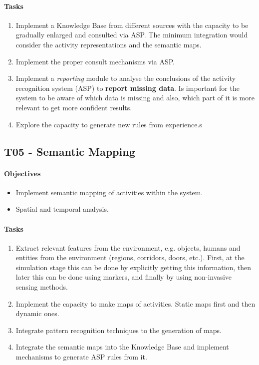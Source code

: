 \paragraph{Tasks}
\begin{enumerate}[label= T04-\Alph*:]
\item Implement a Knowledge Base from different sources with the capacity to be gradually enlarged and consulted via ASP. The minimum integration would consider the activity representations and the semantic maps.
\item Implement the proper consult mechanisms via ASP.
\item Implement a \textit{reporting} module to analyse the conclusions of the activity recognition system (ASP) to \textbf{report missing data}. Is important for the system to be aware of which data is missing and also, which part of it is more relevant to get more confident results.
\item Explore the capacity to generate new rules from experience.s
\end{enumerate}

\subsection*{T05 - Semantic Mapping}
\paragraph{Objectives}
\begin{itemize}
\item Implement semantic mapping of activities within the system.
\item Spatial and temporal analysis.
\end{itemize}
\paragraph{Tasks}
\begin{enumerate}[label= T05-\Alph*:]
\item Extract relevant features from the environment, e.g. objects, humans and entities from the environment (regions, corridors, doors, etc.). First, at the simulation stage this can be done by explicitly getting this information, then later this can be done using markers, and finally by using non-invasive sensing methods.
\item Implement the capacity to make maps of activities. Static maps first and then dynamic ones.
\item Integrate pattern recognition techniques to the generation of maps.
\item Integrate the semantic maps into the Knowledge Base and implement mechanisms to generate ASP rules from it.
\end{enumerate}

